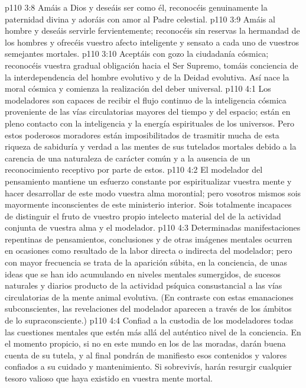 \vs p110 3:8 Amáis a Dios y deseáis ser como él, reconocéis genuinamente la paternidad divina y adoráis con amor al Padre celestial.
\vs p110 3:9 Amáis al hombre y deseáis servirle fervientemente; reconocéis sin reservas la hermandad de los hombres y ofrecéis vuestro afecto inteligente y sensato a cada uno de vuestros semejantes mortales.
\vs p110 3:10 Aceptáis con gozo la ciudadanía cósmica; reconocéis vuestra gradual obligación hacia el Ser Supremo, tomáis conciencia de la interdependencia del hombre evolutivo y de la Deidad evolutiva. Así nace la moral cósmica y comienza la realización del deber universal.
\vs p110 4:1 Los modeladores son capaces de recibir el flujo continuo de la inteligencia cósmica proveniente de las vías circulatorias mayores del tiempo y del espacio; están en pleno contacto con la inteligencia y la energía espirituales de los universos. Pero estos poderosos moradores están imposibilitados de trasmitir mucha de esta riqueza de sabiduría y verdad a las mentes de sus tutelados mortales debido a la carencia de una naturaleza de carácter común y a la ausencia de un reconocimiento receptivo por parte de estos.
\vs p110 4:2 El modelador del pensamiento mantiene un esfuerzo constante por espiritualizar vuestra mente y hacer desarrollar de este modo vuestra alma morontial; pero vosotros mismos sois mayormente inconscientes de este ministerio interior. Sois totalmente incapaces de distinguir el fruto de vuestro propio intelecto material del de la actividad conjunta de vuestra alma y el modelador.
\vs p110 4:3 Determinadas manifestaciones repentinas de pensamientos, conclusiones y de otras imágenes mentales ocurren en ocasiones como resultado de la labor directa o indirecta del modelador; pero con mayor frecuencia se trata de la aparición súbita, en la conciencia, de unas ideas que se han ido acumulando en niveles mentales sumergidos, de sucesos naturales y diarios producto de la actividad psíquica consustancial a las vías circulatorias de la mente animal evolutiva. (En contraste con estas emanaciones subconscientes, las revelaciones del modelador aparecen a través de los ámbitos de lo supraconsciente.)
\vs p110 4:4 Confiad a la custodia de los modeladores todas las cuestiones mentales que estén más allá del auténtico nivel de la conciencia. En el momento propicio, si no en este mundo en los de las moradas, darán buena cuenta de su tutela, y al final pondrán de manifiesto esos contenidos y valores confiados a su cuidado y mantenimiento. Si sobrevivís, harán resurgir cualquier tesoro valioso que haya existido en vuestra mente mortal.

